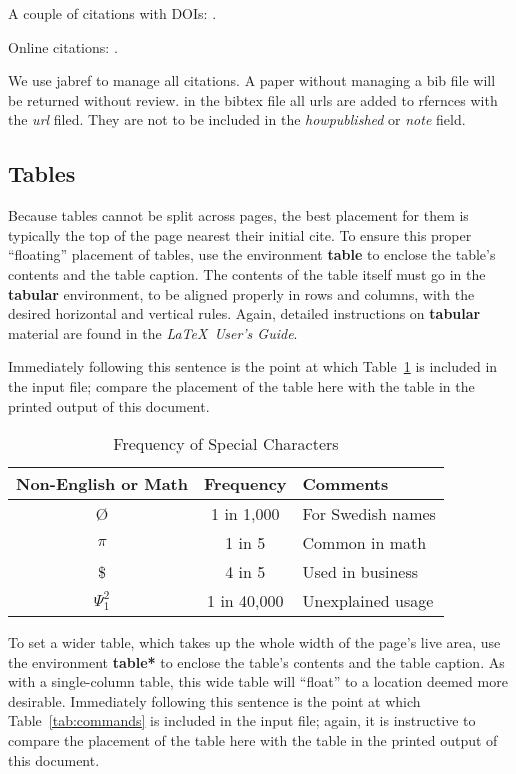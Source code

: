 \documentclass[sigconf]{acmart}
\begin{document}
A couple of citations with DOIs: \cite{2004:ITE:1009386.1010128,
  Kirschmer:2010:AEI:1958016.1958018}.

Online citations: \cite{TUGInstmem, Thornburg01, CTANacmart}.  

We use jabref to manage all citations. A paper without managing a bib
file will be returned without review. in the bibtex file all urls are
added to rfernces with the {\it url} filed. They are not to be
included in the {\it howpublished} or {\it note} field. 


\subsection{Tables}

Because tables cannot be split across pages, the best placement for
them is typically the top of the page nearest their initial cite.  To
ensure this proper ``floating'' placement of tables, use the
environment \textbf{table} to enclose the table's contents and the
table caption.  The contents of the table itself must go in the
\textbf{tabular} environment, to be aligned properly in rows and
columns, with the desired horizontal and vertical rules.  Again,
detailed instructions on \textbf{tabular} material are found in the
\textit{\LaTeX\ User's Guide}.

Immediately following this sentence is the point at which
Table~\ref{tab:freq} is included in the input file; compare the
placement of the table here with the table in the printed output of
this document.

\begin{table}
  \caption{Frequency of Special Characters}
  \label{tab:freq}
  \begin{tabular}{ccl}
    \toprule
    Non-English or Math&Frequency&Comments\\
    \midrule
    \O & 1 in 1,000& For Swedish names\\
    $\pi$ & 1 in 5& Common in math\\
    \$ & 4 in 5 & Used in business\\
    $\Psi^2_1$ & 1 in 40,000& Unexplained usage\\
  \bottomrule
\end{tabular}
\end{table}

To set a wider table, which takes up the whole width of the page's
live area, use the environment \textbf{table*} to enclose the table's
contents and the table caption.  As with a single-column table, this
wide table will ``float'' to a location deemed more desirable.
Immediately following this sentence is the point at which
Table~\ref{tab:commands} is included in the input file; again, it is
instructive to compare the placement of the table here with the table
in the printed output of this document.
\end{document}

